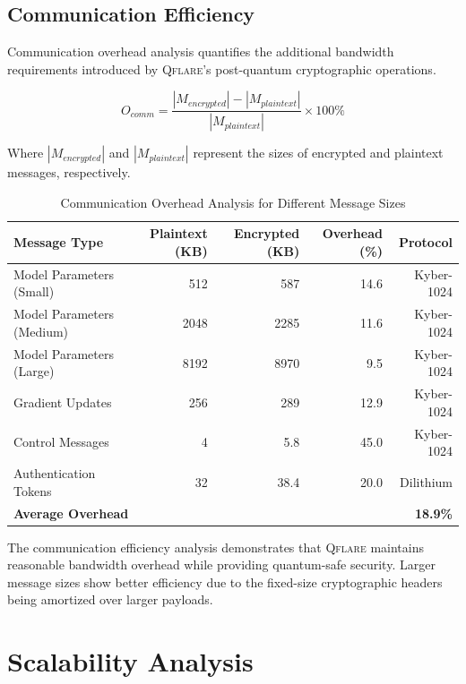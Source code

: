 \documentclass[12pt,a4paper,twoside]{book}
\newcommand{\qflare}{\textsc{Qflare}}
\begin{document}
\subsection{Communication Efficiency}
\label{subsec:communication-efficiency}

Communication overhead analysis quantifies the additional bandwidth requirements introduced by \qflare{}'s post-quantum cryptographic operations.

\begin{equation}
\label{eq:comm-overhead}
O_{comm} = \frac{|M_{encrypted}| - |M_{plaintext}|}{|M_{plaintext}|} \times 100\%
\end{equation}

Where $|M_{encrypted}|$ and $|M_{plaintext}|$ represent the sizes of encrypted and plaintext messages, respectively.

\begin{table}[htbp]
\centering
\caption{Communication Overhead Analysis for Different Message Sizes}
\label{tab:communication-overhead}
\begin{tabular}{@{}lrrrr@{}}
\toprule
Message Type & Plaintext (KB) & Encrypted (KB) & Overhead (\%) & Protocol \\
\midrule
Model Parameters (Small) & 512 & 587 & 14.6 & Kyber-1024 \\
Model Parameters (Medium) & 2048 & 2285 & 11.6 & Kyber-1024 \\
Model Parameters (Large) & 8192 & 8970 & 9.5 & Kyber-1024 \\
Gradient Updates & 256 & 289 & 12.9 & Kyber-1024 \\
Control Messages & 4 & 5.8 & 45.0 & Kyber-1024 \\
Authentication Tokens & 32 & 38.4 & 20.0 & Dilithium \\
\midrule
\multicolumn{4}{l}{\textbf{Average Overhead}} & \textbf{18.9\%} \\
\bottomrule
\end{tabular}
\end{table}

The communication efficiency analysis demonstrates that \qflare{} maintains reasonable bandwidth overhead while providing quantum-safe security. Larger message sizes show better efficiency due to the fixed-size cryptographic headers being amortized over larger payloads.

\section{Scalability Analysis}
\label{sec:scalability-analysis}
\end{document}
